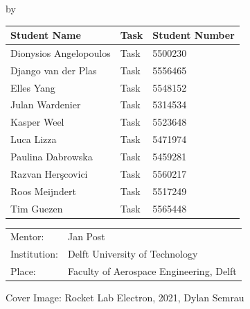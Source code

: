 \begin{titlepage}

\begin{center}

{\makeatletter
\largetitlestyle\fontsize{45}{45}\selectfont\@title
\makeatother}

{\makeatletter
\ifdefvoid{\@subtitle}{}{\titlestyle\fontsize{20}{20}\selectfont\@subtitle}
\makeatother}

\bigskip
\bigskip

by

\bigskip
\bigskip

{\makeatletter
\largetitlestyle\fontsize{25}{25}\selectfont\@author
\makeatother}

\bigskip
\bigskip

\setlength\extrarowheight{2pt}
\begin{tabular}{lll}
    Student Name &Task&Student Number \\\hline
    Dionysios Angelopoulos & Task & 5500230 \\
    Django van der Plas & Task & 5556465 \\
    Elles Yang & Task & 5548152 \\
    Julan Wardenier & Task & 5314534 \\
    Kasper Weel & Task & 5523648 \\
    Luca Lizza & Task & 5471974 \\
    Paulina Dabrowska & Task & 5459281 \\
    Razvan Herşcovici & Task & 5560217 \\
    Roos Meijndert & Task & 5517249 \\
    Tim Guezen & Task & 5565448 \\
\end{tabular}

\vfill

\begin{tabular}{ll}
    Mentor: & Jan Post \\
    Institution: & Delft University of Technology \\
    Place: & Faculty of Aerospace Engineering, Delft \\
\end{tabular}

\vspace{1cm} 
\small{Cover Image: Rocket Lab Electron, 2021, Dylan Semrau}


\end{center}
\end{titlepage}
